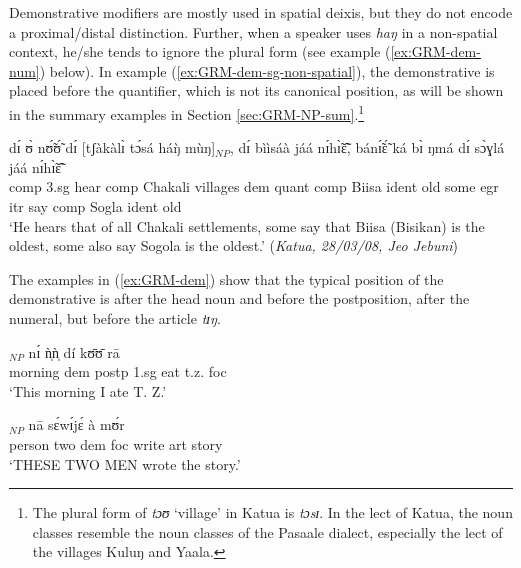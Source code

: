 \begin{exe}
\begin{exe}
\begin{exe}
{\begin{exe}
\begin{exe}
\begin{exe}
\begin{exe}
\begin{exe}
\begin{exe}
\begin{exe}
\begin{xlist}
\begin{exe}
\begin{exe}
\begin{exe}
\begin{exe}
Demonstrative  modifiers are mostly used in spatial deixis, but they do not
encode a proximal/distal distinction. Further, when a speaker uses {\it haŋ}  in
a non-spatial context, he/she tends to ignore the plural form (see example
(\ref{ex:GRM-dem-num}) below). In example (\ref{ex:GRM-dem-sg-non-spatial}), the
 demonstrative is placed before the quantifier,  which is not its canonical
position, as will be  shown in the summary examples in Section
\ref{sec:GRM-NP-sum}.\footnote{The plural form of {\it tɔʊ} `village' in Katua 
is
{\it tɔsɪ}. In the lect of Katua, the noun classes resemble the noun classes of
the Pasaale dialect, especially the lect of the villages  Kuluŋ and Yaala.} 



\begin{exe}
   \ex\label{ex:GRM-dem-sg-non-spatial}

\gll  dɪ́ ʊ̀ nʊ̃́ʊ̃́  dɪ́ [tʃàkàlɪ̀ tɔ́sá háŋ̀ mùŋ]$_{NP}$, dɪ́ bììsáà 
jáá nɪ́hɪ̃̀ɛ̃̂, bánɪ̃́ɛ̃́ 
ká bɪ̀ ŋmá dɪ́ sɔ̀ɣlá jáá nɪ́hɪ̃̀ɛ̃̂ \\
{\sc comp} {\sc 3.sg}  hear {\sc comp} Chakali villages {\sc dem} {\sc quant}
{\sc comp} Biisa {\sc ident} old some {\sc egr} {\sc itr}  say {\sc comp}
Sogla {\sc
ident} old \\
 \glt `He hears that of all  Chakali
settlements, some say that Biisa (Bisikan) is the oldest,  some
also say Sogola is the oldest.' ({\it Katua, 28/03/08, Jeo Jebuni})

\z



The examples in (\ref{ex:GRM-dem}) show that the typical position of  the
demonstrative is after the head noun and before the postposition, after the
numeral,  but before the article {\it tɪŋ}. 


\ea\label{ex:GRM-dem} 
 
 
  \ea\label{ex:GRM-dem-n-postp} 
 \gll [tʃʊ̀ɔ̀sá háŋ̀]$_{NP}$ nɪ́ ǹ̩ǹ̩ dí kʊ̄ʊ̄ rā\\
 morning {\sc dem} {\sc postp} {\sc 1.sg} eat t.z. {\sc foc} \\
 \glt  `This morning I ate T. Z.'

   \ex\label{ex:GRM-dem-num} 
 \gll [nárá bálɪ̀ɛ̀ háŋ̀]$_{NP}$ nā sɛ́wɪ́jɛ́ à mʊ́r\\
person two {\sc dem}  {\sc foc} write {\sc art} story\\
\glt `THESE TWO MEN wrote the story.' 


\end{exe}
\end{exe}
\end{exe}
\end{exe}
\end{exe}
\end{xlist}
\end{exe}
\end{exe}
\end{exe}
\end{exe}
\end{exe}
\end{exe}
\end{exe}}
\end{exe}
\end{exe}
\end{exe}
